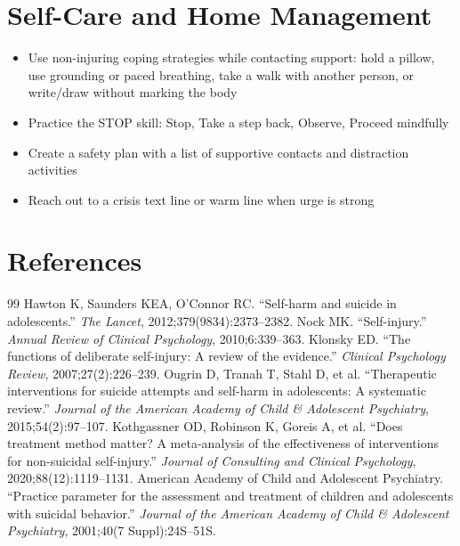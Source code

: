 \section*{Self-Care and Home Management}
\begin{itemize}
  \item Use non-injuring coping strategies while contacting support: hold a pillow, use grounding or paced breathing, take a walk with another person, or write/draw without marking the body
  \item Practice the STOP skill: Stop, Take a step back, Observe, Proceed mindfully
  \item Create a safety plan with a list of supportive contacts and distraction activities
  \item Reach out to a crisis text line or warm line when urge is strong
\end{itemize}

\section*{References}
\begin{thebibliography}{99}
 Hawton K, Saunders KEA, O'Connor RC. ``Self-harm and suicide in adolescents.'' \textit{The Lancet}, 2012;379(9834):2373--2382.
 Nock MK. ``Self-injury.'' \textit{Annual Review of Clinical Psychology}, 2010;6:339--363.
 Klonsky ED. ``The functions of deliberate self-injury: A review of the evidence.'' \textit{Clinical Psychology Review}, 2007;27(2):226--239.
 Ougrin D, Tranah T, Stahl D, et al. ``Therapeutic interventions for suicide attempts and self-harm in adolescents: A systematic review.'' \textit{Journal of the American Academy of Child \& Adolescent Psychiatry}, 2015;54(2):97--107.
 Kothgassner OD, Robinson K, Goreis A, et al. ``Does treatment method matter? A meta-analysis of the effectiveness of interventions for non-suicidal self-injury.'' \textit{Journal of Consulting and Clinical Psychology}, 2020;88(12):1119--1131.
 American Academy of Child and Adolescent Psychiatry. ``Practice parameter for the assessment and treatment of children and adolescents with suicidal behavior.'' \textit{Journal of the American Academy of Child \& Adolescent Psychiatry}, 2001;40(7 Suppl):24S--51S.
\end{thebibliography}
